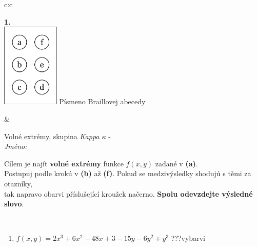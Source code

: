 \documentclass[10pt]{report}
\begin{document}
\begin{tabular}{c:c}
\begin{minipage}[c][104.5mm][t]{0.5\linewidth}
\begin{center}
\begin{minipage}{0.79\linewidth}
\begin{center}
\begin{varwidth}{\linewidth}
\begin{enumerate}
\end{enumerate}
\end{varwidth}
\end{center}
\end{minipage}
\begin{minipage}{0.20\linewidth}
\begin{center}
{\Huge\bfseries 1.} \\[2mm]
\includegraphics[height=40mm]{../images/braille.png}
{\small Písmeno Braillovej abecedy}
\end{center}
\end{minipage}
\end{center}
\end{minipage}
&
\begin{minipage}[c][104.5mm][t]{0.5\linewidth}
\begin{center}
\vspace{7mm}
{\huge Volné extrémy, skupina \textit{Kappa $\kappa$} -}\\[5mm]
\textit{Jméno:}\phantom{xxxxxxxxxxxxxxxxxxxxxxxxxxxxxxxxxxxxxxxxxxxxxxxxxxxxxxxxxxxxxxxxx}\\[5mm]
\begin{minipage}{0.95\linewidth}
\begin{center}
Cílem je najít \textbf{volné extrémy} funkce $f(x,y)$ zadané v \textbf{(a)}.\\Postupuj podle krokú v \textbf{(b)} až \textbf{(f)}. Pokud se medzivýsledky shodujú s těmi za otazníky,\\tak napravo obarvi příslušející kroužek načerno. \textbf{Spolu odevzdejte výsledné slovo}.
\end{center}
\end{minipage}
\\[1mm]
\begin{minipage}{0.79\linewidth}
\begin{center}
\begin{varwidth}{\linewidth}
\begin{enumerate}
\normalsize
\item $f(x,y)=2x^3+6x^2-48x+3-15y-6y^2+y^3$\quad \dotfill\; ???\;\dotfill \quad vybarvi

\end{enumerate}
\end{varwidth}
\end{center}
\end{minipage}
\end{center}
\end{minipage}
\end{tabular}
\end{document}

